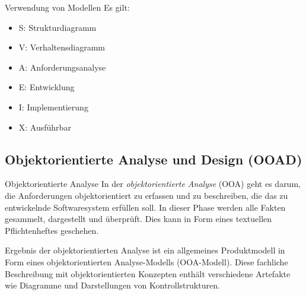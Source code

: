 \begin{bonus}{Verwendung von Modellen}
    Es gilt:
    \begin{itemize}
        \item S: Strukturdiagramm
        \item V: Verhaltensdiagramm
        \item A: Anforderungsanalyse
        \item E: Entwicklung
        \item I: Implementierung
        \item X: Ausführbar
    \end{itemize}
\end{bonus}

\subsection{Objektorientierte Analyse und Design (OOAD)}

\begin{defi}{Objektorientierte Analyse}
    In der \emph{objektorientierte Analyse} (OOA) geht es darum, die Anforderungen objektorientiert zu erfassen und zu beschreiben, die das zu entwickelnde Softwaresystem erfüllen soll.
    In dieser Phase werden alle Fakten gesammelt, dargestellt und überprüft.
    Dies kann in Form eines textuellen Pflichtenheftes geschehen.

    Ergebnis der objektorientierten Analyse ist ein allgemeines Produktmodell in Form eines objektorientierten Analyse-Modells (OOA-Modell).
    Diese fachliche Beschreibung mit objektorientierten Konzepten enthält verschiedene Artefakte wie Diagramme und Darstellungen von Kontrollstrukturen.
\end{defi}

